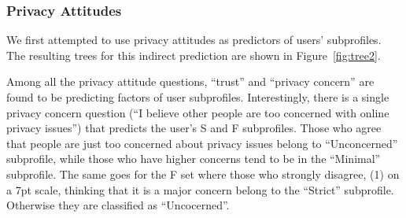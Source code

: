 \subsubsection{Privacy Attitudes}

We first attempted to use privacy attitudes as predictors of users' subprofiles. The resulting trees for this indirect prediction are shown in Figure~\ref{fig:tree2}.


%	





Among all the privacy attitude questions, ``trust'' and ``privacy concern'' are found to be predicting factors of user subprofiles. Interestingly, there is a single  privacy concern question (``I believe other people are too concerned with online privacy issues'') that predicts the user's S and F subprofiles. Those who agree that people are just too concerned about privacy issues belong to ``Unconcerned'' subprofile, while those who have higher concerns tend to be in the ``Minimal'' subprofile. The same goes for the F set where those who strongly disagree, (1) on a 7pt scale, thinking that it is a major concern belong to the ``Strict'' subprofile. Otherwise they are classified as ``Uncocerned''.

